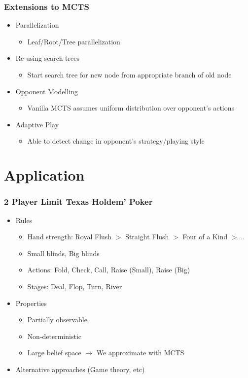 \documentclass{beamer}
\begin{document}
  \begin{frame}
    \frametitle{Extensions to MCTS}
    \begin{itemize}
      \item<1-> Parallelization
      \begin{itemize}
        \item Leaf/Root/Tree parallelization
      \end{itemize}
      \item<2-> Re-using search trees
      \begin{itemize}
        \item Start search tree for new node from appropriate branch of old node
      \end{itemize}
      \item<3-> Opponent Modelling
      \begin{itemize}
        \item Vanilla MCTS assumes uniform distribution over opponent's actions
      \end{itemize}
      \item<4-> Adaptive Play
      \begin{itemize}
        \item Able to detect change in opponent's strategy/playing style
      \end{itemize}
    \end{itemize}
  \end{frame}
  
  \section{Application}
    
  \begin{frame}
    \frametitle{2 Player Limit Texas Holdem' Poker}
    \begin{itemize}
      \item<1-> Rules
      \begin{itemize}
        \item Hand strength: Royal Flush $>$ Straight Flush $>$ Four of a Kind $> ... $
        \item Small blinds, Big blinds
        \item Actions: Fold, Check, Call, Raise (Small), Raise (Big)
        \item Stages: Deal, Flop, Turn, River
      \end{itemize}
      \item<2-> Properties
      \begin{itemize}
        \item Partially observable
        \item Non-deterministic
        \item Large belief space $\rightarrow$ We approximate with MCTS
      \end{itemize}
      \item<3-> Alternative approaches (Game theory, etc)
    \end{itemize}
  \end{frame}
  
\end{document}
